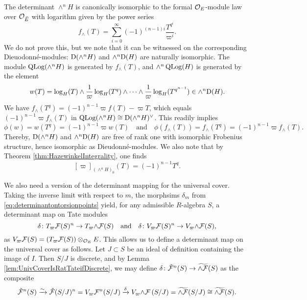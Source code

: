 \documentclass[../main.tex]{subfiles}
\begin{document}
\begin{xpl*}\label{xpl:DeterminantOfH}
  The determinant $\wedge^n H$ is canonically isomorphic to the formal
  $\mathcal{O}_E$-module law over 
  $\mathcal{O}_{\breve {E}}$ with logarithm given by the power series
  \begin{equation*}
    f_\wedge(T) = \sum_{i=0}^\infty (-1)^{(n-1)i} \frac{T^{q^i}}{\varpi^i}.
  \end{equation*}
  We do not prove this, but we note that it can be witnessed on the
  corresponding Dieuodonn\'e-modules: $\mathrm{D}(\wedge^n H)$ and 
  $\wedge^n \mathrm{D}(H)$ are naturally isomorphic. The module $\operatorname {QLog}(\wedge^n H)$
  is generated by $f_\wedge(T)$, and $\wedge^n \operatorname {QLog}(H)$ is generated by the
  element
  \begin{equation*}
    w(T) = \log_H(T) \wedge \frac 1\varpi \log_H(T^q) \wedge \dots \wedge \frac
    1\varpi \log_H(T^{q^{n-1}}) \in \wedge^n \mathrm{D}(H).
  \end{equation*}
  We have $f_\wedge(T^q) = (-1)^{n-1} \varpi f(T) - \varpi T$, which equals
  $(-1)^{n-1}\varpi f_\wedge(T)$ in $\operatorname {QLog}(\wedge^n H) \cong \mathrm{D}(\wedge^n
  H)^\vee$. 
  This readily implies
  \begin{equation*}
    \phi(w) = w(T^q) = (-1)^{n-1} \varpi w(T) \quad \text{and} \quad
    \phi(f_\wedge(T)) = f_\wedge(T^q) = (-1)^{n-1}\varpi f_\wedge(T).
  \end{equation*}
  Thereby, $\mathrm{D}(\wedge^n H)$ and $\wedge^n \mathrm{D}(H)$ are free of rank one
  with isomorphic Frobenius structure, hence isomorphic as Dieudonn\'e-modules.
  We also note that by Theorem \ref{thm:HazewinkelIntegrality}, one finds
  \begin{equation} \label{eq:detformalmodulevarpiexpl}
    [\varpi]_{(\wedge^n H)_0}(T) = (-1)^{n-1} T^q.
  \end{equation}
\end{xpl*}

We also need a version of the determinant mapping for the universal cover. 
Taking the inverse limit with respect to $m$, the morphsims $\delta_m$ from
\eqref{eq:determinantontorsionpoints} yield, for any 
admissible $R$-algebra $S$, a determinant map on Tate modules
\begin{equation*}
  \delta \colon T_\varpi \mathcal{F} (S)^n \to T_\varpi {\wedge \mathcal{F}} (S) \quad \text{and} \quad
  \delta \colon V_\varpi \mathcal{F} (S)^n \to V_\varpi {\wedge \mathcal{F}} (S),
\end{equation*}
as $V_\varpi \mathcal{F}(S) = (T_\varpi \mathcal{F}(S))\otimes_{\mathcal{O}_E} E$. This allows us to define a 
determinant map on the universal cover as follows. Let $J \subset S$ be an ideal
of definition containing the image of $I$. Then
$S/J$ is discrete, and by Lemma \ref{lem:UnivCoverIsRatTateifDiscrete}, we may
define $\delta \colon \tilde {\mathcal{F}}^n(S) \to \widetilde {\wedge \mathcal{F}}(S)$
as the composite
\begin{equation*}
  \tilde {\mathcal{F}}^n(S) \xrightarrow{\sim} \tilde {\mathcal{F}}(S/J)^n = V_\varpi \mathcal{F}^n(S/J) 
  \xrightarrow{\delta} V_\varpi {\wedge \mathcal{F}}\, (S/J) = \widetilde {\wedge \mathcal{F}}(S/J) 
  \cong \widetilde {\wedge \mathcal{F}}(S).
\end{equation*}
\end{document}
